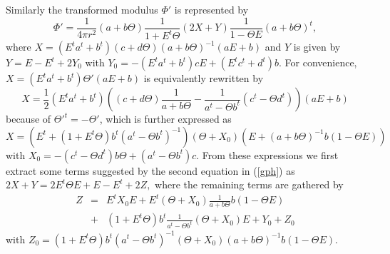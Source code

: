 \documentclass[12pt,a4paper]{article}
\newcommand{\Te}{\Theta}
\begin{document}
Similarly the transformed modulus $\Phi'$ is represented by 
\begin{equation}
\Phi' = \frac{1}{4\pi r^2}(a+b\Te)\frac{1}{1+E^t\Te}(2X+Y)
\frac{1}{1-\Te E}(a+b\Te)^t,
\end{equation}
where $X = (E^ta^t+b^t)(c+d\Te)(a+b\Te)^{-1}(aE+b)$ and $Y$ is given by
$Y = E-E^t + 2Y_0$ with $Y_0 = -(E^ta^t + b^t)cE + (E^tc^t+d^t)b$.
For convenience, $X=(E^ta^t + b^t)\Te'(aE + b)$ is equivalently 
rewritten by
\begin{equation}
X = \frac{1}{2}(E^ta^t+ b^t)((c+d\Te)\frac{1}{a+b\Te}- 
\frac{1}{a^t-\Te b^t}(c^t-\Te d^t))(aE + b)
\end{equation}
because of  ${\Te'}^t = - \Te'$, which is further expressed as
$X=( E^t + (1+E^t\Te)b^t(a^t-\Te b^t)^{-1})(\Te +X_0)(E+ (a+b\Te)^{-1}
b(1-\Te E))$ with $X_0 = -(c^t-\Te d^t)b\Te + (a^t - \Te b^t)c$.
From these expressions we 
first extract some terms suggested by the second equation in (\ref{gph})
as $2X + Y = 2E^t\Te E + E - E^t + 2Z,$
where the remaining terms are gathered by
\begin{eqnarray}
Z &=& E^tX_0E + E^t(\Te + X_0)\frac{1}{a + b\Te} b(1-\Te E) \nonumber \\
 &+& (1 + E^t\Te)b^t\frac{1}{a^t -\Te b^t}(\Te + X_0)E + Y_0 + Z_0
\label{zyz}\end{eqnarray}
with $Z_0 = (1+ E^t\Te)b^t(a^t- \Te b^t)^{-1}
(\Te+X_0)(a+b\Te)^{-1}b(1-\Te E)$.
\end{document}
